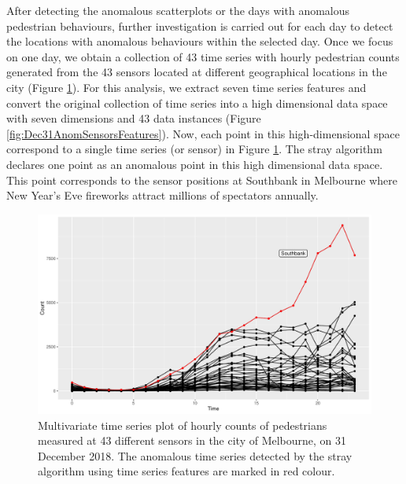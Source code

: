 \documentclass[11pt,a4paper,]{article}
\theoremstyle{definition}
\theoremstyle{definition}
\theoremstyle{definition}
\theoremstyle{remark}
\begin{document}
After detecting the anomalous scatterplots or the days with anomalous pedestrian behaviours, further investigation is carried out for each day to detect the locations with anomalous behaviours within the selected day. Once we focus on one day, we obtain a collection of 43 time series with hourly pedestrian counts generated from the 43 sensors located at different geographical locations in the city (Figure \ref{fig:Dec31AnomSensors}). For this analysis, we extract seven time series features \autocites[similar to][]{talagala2019anomaly}{hyndman2015large} and convert the original collection of time series into a high dimensional data space with seven dimensions and 43 data instances (Figure \ref{fig:Dec31AnomSensorsFeatures}). Now, each point in this high-dimensional space correspond to a single time series (or sensor) in Figure \ref{fig:Dec31AnomSensors}. The stray algorithm declares one point as an anomalous point in this high dimensional data space. This point corresponds to the sensor positions at Southbank in Melbourne where New Year's Eve fireworks attract millions of spectators annually.

\begin{figure}[h]

{\centering \includegraphics[width=1\linewidth]{figure/Dec31AnomSensors-1} 

}

\caption{Multivariate time series plot of hourly counts of  pedestrians measured at 43 different sensors in the city of Melbourne,  on 31 December 2018. The anomalous time series detected by the stray algorithm using time series features are marked in red colour.}\label{fig:Dec31AnomSensors}
\end{figure}
\end{document}
